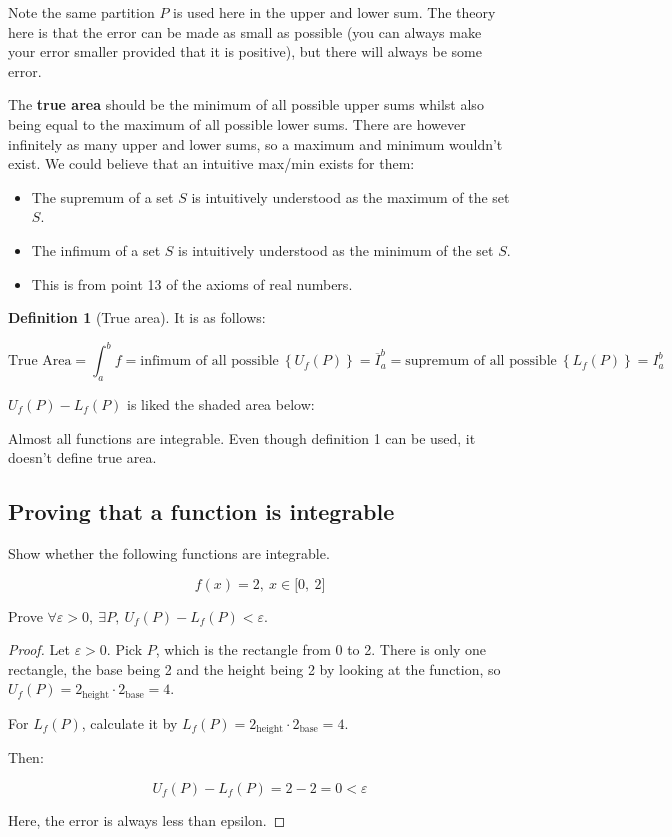 \documentclass[12pt]{article}
\theoremstyle{plain}
\theoremstyle{remark}
\theoremstyle{definition}
\newtheorem{definition}{Definition}[section]
\begin{document}
Note the same partition \(P\) is used here in the upper and lower sum.
The theory here is that the error can be made as small as possible (you
can always make your error smaller provided that it is positive), but
there will always be some error.

The \textbf{true area} should be the minimum of all possible upper sums
whilst also being equal to the maximum of all possible lower sums. There
are however infinitely as many upper and lower sums, so a maximum and
minimum wouldn't exist. We could believe that an intuitive max/min
exists for them:

\begin{itemize}
\item
  The supremum of a set \(S\) is intuitively understood as the maximum
  of the set \(S\).
\item
  The infimum of a set \(S\) is intuitively understood as the minimum of
  the set \(S\).
\item
  This is from point 13 of the axioms of real numbers.
\end{itemize}

\begin{definition}[True area]
It is as follows:

\[{\text{True\ Area} = \int_{a}^{b}f }{= \text{infimum\ of\ all\ possible}\ \left\{ U_{f}(P) \right\} }{= {\overline{I}}_{a}^{b} }{= \text{supremum\ of\ all\ possible}\ \left\{ L_{f}(P) \right\} = I_{a}^{b}} \]
\end{definition}

\(U_{f}(P) - L_{f}(P)\) is liked the shaded area below:


Almost all functions are integrable. Even though definition 1 can be
used, it doesn't define true area.


\subsection{Proving that a function is
integrable}

Show whether the following functions are integrable.

\[f(x) = 2,\ x \in \lbrack 0,\ 2\rbrack\]

Prove
\(\forall\varepsilon > 0,\ \exists P,\ U_{f}(P) - L_{f}(P) < \varepsilon\).

\begin{proof} Let \(\varepsilon > 0\). Pick \(P\), which is the
rectangle from 0 to 2. There is only one rectangle, the base being 2 and
the height being 2 by looking at the function, so
\(U_{f}(P) = 2_{\text{height}} \cdot 2_{\text{base}} = 4\).

For \(L_{f}(P)\), calculate it by
\(L_{f}(P) = 2_{\text{height}} \cdot 2_{\text{base}} = 4\).

Then:

\[U_{f}(P) - L_{f}(P) = 2 - 2 = 0 < \varepsilon\]

Here, the error is always less than epsilon. 
\end{proof}
\end{document}
